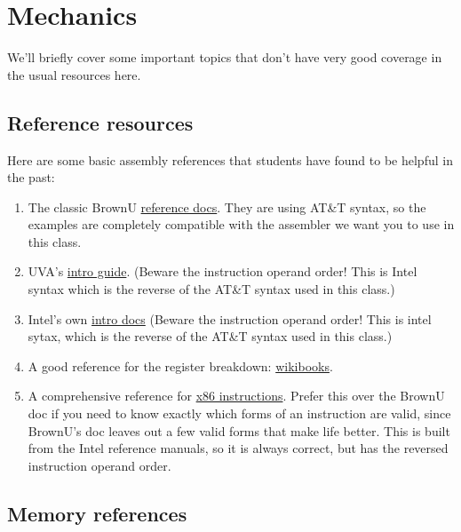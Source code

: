 \documentclass[11pt]{article}
\begin{document}
\section{Mechanics}

We'll briefly cover some important topics that don't have very good coverage in the usual
resources here.

\subsection{Reference resources}

Here are some basic assembly references that students have found to be helpful in the
past:

\begin{enumerate}
    \item The classic BrownU
        \href{https://cs.brown.edu/courses/cs033/docs/guides/x64_cheatsheet.pdf}{reference
        docs}. They are using AT\&T syntax, so the examples are completely compatible with
        the assembler we want you to use in this class.
    \item UVA's \href{https://www.cs.virginia.edu/~evans/cs216/guides/x86.html}{intro
        guide}. (Beware the instruction operand order! This is Intel syntax which
        is the reverse of the AT\&T syntax used in this class.)
    \item Intel's own
        \href{https://www.intel.com/content/dam/develop/external/us/en/documents/introduction-to-x64-assembly-181178.pdf}{intro docs}
        (Beware the instruction operand order! This is intel sytax, which is the reverse
        of the AT\&T syntax used in this class.)
    \item A good reference for the register breakdown:
        \href{https://en.wikibooks.org/wiki/X86_Assembly/X86_Architecture}{wikibooks}.
    \item A comprehensive reference for
        \href{https://www.felixcloutier.com/x86/}{x86 instructions}. Prefer this over the
        BrownU doc if you need to know exactly which forms of an instruction are valid,
        since BrownU's doc leaves out a few valid forms that make life better. This is
        built from the Intel reference manuals, so it is always correct, but has the
        reversed instruction operand order.
\end{enumerate}

\subsection{Memory references}
\end{document}
